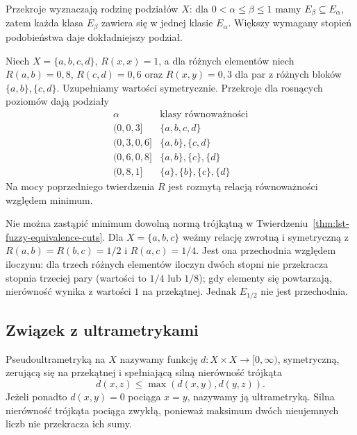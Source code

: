 Przekroje wyznaczają rodzinę podziałów $X$:
dla $0<\alpha\leq\beta\leq1$ mamy $E_\beta\subseteq E_\alpha$,
zatem każda klasa $E_\beta$ zawiera się w jednej klasie
$E_\alpha$. Większy wymagany stopień podobieństwa daje
dokładniejszy podział.

\begin{przyklad}\label{ex:lst-fuzzy-partitions}
Niech $X=\{a,b,c,d\}$, $R(x,x)=1$, a dla różnych elementów
niech $R(a,b)=0{,}8$, $R(c,d)=0{,}6$ oraz
$R(x,y)=0{,}3$ dla par z różnych bloków
$\{a,b\},\{c,d\}$. Uzupełniamy wartości symetrycznie.
Przekroje dla rosnących poziomów dają podziały
\[
\begin{array}{c|l}
 \alpha & \text{klasy równoważności}\\ \hline
 (0,0{,}3] & \{a,b,c,d\}\\
 (0{,}3,0{,}6] & \{a,b\},\{c,d\}\\
 (0{,}6,0{,}8] & \{a,b\},\{c\},\{d\}\\
 (0{,}8,1] & \{a\},\{b\},\{c\},\{d\}
\end{array}
\]
Na mocy poprzedniego twierdzenia $R$ jest rozmytą relacją
równoważności względem minimum.
\begin{center}
\end{center}
\end{przyklad}

Nie można zastąpić minimum dowolną normą trójkątną w
Twierdzeniu~\ref{thm:lst-fuzzy-equivalence-cuts}.
Dla $X=\{a,b,c\}$ weźmy relację zwrotną i symetryczną
z $R(a,b)=R(b,c)=1/2$ i $R(a,c)=1/4$.
Jest ona przechodnia względem iloczynu: dla trzech różnych
elementów iloczyn dwóch stopni nie przekracza stopnia
trzeciej pary (wartości to $1/4$ lub $1/8$); gdy elementy
się powtarzają, nierówność wynika z wartości $1$ na przekątnej.
Jednak $E_{1/2}$ nie jest przechodnia.

\subsection{Związek z ultrametrykami}
\begin{definicja}\label{def:ncl-pseudoultrametric}
Pseudoultrametryką na $X$ nazywamy funkcję
$d:X\times X\to[0,\infty)$, symetryczną, zerującą się
na przekątnej i spełniającą silną nierówność trójkąta
\[
 d(x,z)\leq\max(d(x,y),d(y,z)).
\]
Jeżeli ponadto $d(x,y)=0$ pociąga $x=y$, nazywamy
ją ultrametryką. Silna nierówność trójkąta pociąga
zwykłą, ponieważ maksimum dwóch nieujemnych liczb
nie przekracza ich sumy.
\end{definicja}

